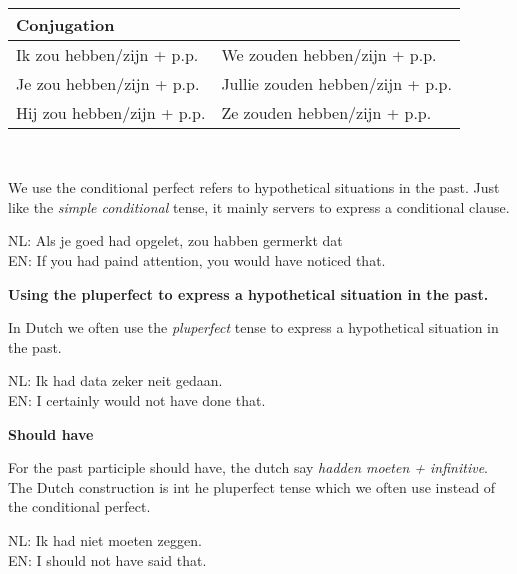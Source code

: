 \documentclass[letterpaper,11pt]{article}
\begin{document}
\\
\begin{tabular}[t]{l l}
    \textbf{Conjugation} \\
    \hline
    Ik zou hebben/zijn + p.p. & We zouden hebben/zijn + p.p. \\
    Je zou hebben/zijn + p.p. & Jullie zouden hebben/zijn + p.p. \\
    Hij zou hebben/zijn + p.p. & Ze zouden hebben/zijn + p.p. \\
    \hline
\end{tabular}
\\
\par{We use the conditional perfect refers to hypothetical situations in the
    past. Just like the \textit{simple conditional} tense, it mainly servers to
express a conditional clause.}
\\
\begin{small}
    NL: Als je goed had opgelet, zou habben germerkt dat \\
    EN: If you had paind attention, you would have noticed that. \\
\end{small}
\textbf{Using the pluperfect to express a hypothetical situation in the past.}
\par{In Dutch we often use the \textit{pluperfect} tense to express a hypothetical
situation in the past.}
\begin{small}
    NL: Ik had data zeker neit gedaan. \\
    EN: I certainly would not have done that. \\
\end{small}
\textbf{Should have}
\par{For the past participle should have, the dutch say \textit{hadden moeten +
    infinitive}. The Dutch construction is int he pluperfect tense which we often
use instead of the conditional perfect.} 
\\
\begin{small}
     NL: Ik had niet moeten zeggen.   \\
     EN: I should not have said that. \\
\end{small}
\end{document}
